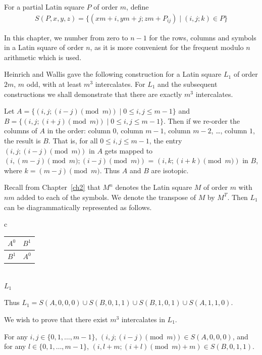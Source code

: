 \documentclass[12pt]{report}
\begin{document}
For a partial Latin square $P$ of order $m$, define
\begin{eqnarray*}
S(P,x,y,z) = \{ ( xm + i, ym + j; zm + P_{ij} ) \mid (i,j;k) \in P \}
\end{eqnarray*}

In this chapter, we number from zero to $n-1$ for the rows, columns and symbols in a Latin square of order $n$,
as it is more convenient for the frequent modulo $n$ arithmetic which is used.

Heinrich and Wallis gave the following construction for a Latin
square $L_1$ of order $2m$, $m$ odd, with at least $m^3$ intercalates.
For $L_1$ and the subsequent constructions we shall demonstrate
that there are exactly $m^3$ intercalates.

Let $A = \{ (i,j; (i-j) \pmod{m}) \mid 0 \leq i,j \leq m-1 \}$
and $B = \{ (i,j; (i+j) \pmod{m}) \mid 0 \leq i,j \leq m-1 \}$.
Then if we re-order the columns of $A$ in the order: column $0$, column
$m-1$, column $m-2$, \dots, column $1$, the result is $B$.  That is,
for all $0 \leq i,j \leq m-1$, the entry $(i,j; (i-j) \pmod{m})$
in $A$ gets mapped to $(i,(m-j) \pmod{m}; (i-j) \pmod{m})$
= $(i,k;(i+k) \pmod{m})$ in $B$, where $k = (m-j) \pmod{m}$.  Thus $A$ and $B$
are isotopic.

Recall from Chapter~\ref{ch2} that $M^n$ denotes the Latin square $M$ of order $m$
with $nm$ added to each of the symbols.  We denote the transpose of $M$
by $M^T$.  Then $L_1$ can be diagrammatically represented as follows.

\begin{center}
\begin{tabular}{c}
\begin{tabular}{|c|c|}
\hline
$A^0$ & $B^1$ \\
\hline
$B^1$ & $A^0$ \\
\hline
\end{tabular} \\[3pt]
 $L_1$
\end{tabular}
\end{center}
Thus $L_1 = S(A,0,0,0) \cup S(B,0,1,1) \cup S(B,1,0,1) \cup S(A,1,1,0)$.

We wish to prove that there exist $m^3$ intercalates in $L_1$. 

For any $i,j \in \{ 0,1, \dots, m-1 \}$, $(i, j; (i-j) \pmod{m}) \in S(A,0,0,0)$,
and for any $l \in \{ 0,1, \dots, m-1 \}$, $(i, l+m; (i+l) \pmod{m}+m) \in S(B,0,1,1)$.
\end{document}
